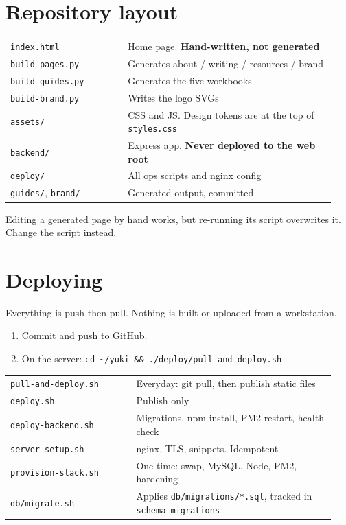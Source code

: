 \documentclass[11pt,a4paper]{article}
\newcommand{\code}[1]{\texttt{\small #1}}
\begin{document}
\section{Repository layout}

\begin{longtable}{@{}p{0.34\linewidth}p{0.60\linewidth}@{}}
\toprule
\code{index.html}        & Home page. \textbf{Hand-written, not generated} \\
\code{build-pages.py}    & Generates about / writing / resources / brand \\
\code{build-guides.py}   & Generates the five workbooks \\
\code{build-brand.py}    & Writes the logo SVGs \\
\code{assets/}           & CSS and JS. Design tokens are at the top of \code{styles.css} \\
\code{backend/}          & Express app. \textbf{Never deployed to the web root} \\
\code{deploy/}           & All ops scripts and nginx config \\
\code{guides/}, \code{brand/} & Generated output, committed \\
\bottomrule
\end{longtable}

Editing a generated page by hand works, but re-running its script overwrites
it. Change the script instead.

\section{Deploying}

Everything is push-then-pull. Nothing is built or uploaded from a workstation.

\begin{enumerate}
  \item Commit and push to GitHub.
  \item On the server: \code{cd \textasciitilde/yuki \&\& ./deploy/pull-and-deploy.sh}
\end{enumerate}

\begin{longtable}{@{}p{0.36\linewidth}p{0.58\linewidth}@{}}
\toprule
\code{pull-and-deploy.sh}  & Everyday: git pull, then publish static files \\
\code{deploy.sh}           & Publish only \\
\code{deploy-backend.sh}   & Migrations, npm install, PM2 restart, health check \\
\code{server-setup.sh}     & nginx, TLS, snippets. Idempotent \\
\code{provision-stack.sh}  & One-time: swap, MySQL, Node, PM2, hardening \\
\code{db/migrate.sh}       & Applies \code{db/migrations/*.sql}, tracked in \code{schema\_migrations} \\
\bottomrule
\end{longtable}
\end{document}
